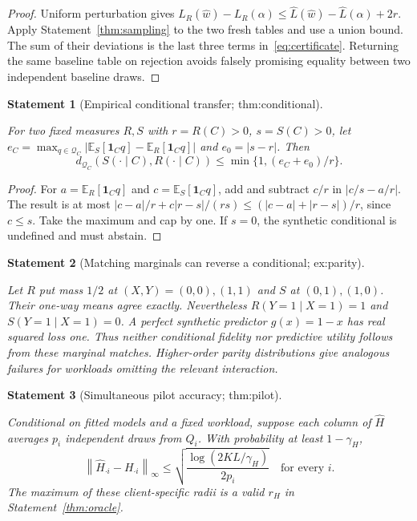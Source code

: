 \documentclass[11pt]{article}
\newtheorem{statement}{Statement}
\newcommand{\E}{\mathbb E}\newcommand{\Prb}{\mathbb P}\newcommand{\ind}{\mathbf 1}
\newcommand{\Q}{\mathcal Q}\newcommand{\Z}{\mathcal Z}\newcommand{\W}{\mathcal W}
\newcommand{\norm}[1]{\left\lVert#1\right\rVert}\newcommand{\qh}{\widehat H}
\begin{document}
\begin{proof}
Uniform perturbation gives $L_R(\widehat w)-L_R(\alpha)\le\widehat L(\widehat w)-\widehat L(\alpha)+2r$. Apply Statement~\ref{thm:sampling} to the two fresh tables and use a union bound. The sum of their deviations is the last three terms in~\eqref{eq:certificate}. Returning the same baseline table on rejection avoids falsely promising equality between two independent baseline draws.
\end{proof}

\begin{statement}[Empirical conditional transfer; thm:conditional]\label{thm:conditional}

For two fixed measures $R,S$ with $r=R(C)>0$, $s=S(C)>0$, let
$e_C=\max_{q\in\Q_C}|\E_S[\ind_Cq]-\E_R[\ind_Cq]|$ and $e_0=|s-r|$. Then
\begin{equation}\label{eq:conditional}
d_{\Q_C}(S(\cdot\mid C),R(\cdot\mid C))
\le\min\{1,(e_C+e_0)/r\}.
\end{equation}

\end{statement}

\begin{proof}
For $a=\E_R[\ind_Cq]$ and $c=\E_S[\ind_Cq]$, add and subtract $c/r$ in $|c/s-a/r|$. The result is at most $|c-a|/r+c|r-s|/(rs)\le(|c-a|+|r-s|)/r$, since $c\le s$. Take the maximum and cap by one. If $s=0$, the synthetic conditional is undefined and must abstain.
\end{proof}

\begin{statement}[Matching marginals can reverse a conditional; ex:parity]\label{ex:parity}

Let $R$ put mass $1/2$ at $(X,Y)=(0,0),(1,1)$ and $S$ at $(0,1),(1,0)$. Their one-way means agree exactly. Nevertheless $R(Y=1\mid X=1)=1$ and $S(Y=1\mid X=1)=0$. A perfect synthetic predictor $g(x)=1-x$ has real squared loss one. Thus neither conditional fidelity nor predictive utility follows from these marginal matches. Higher-order parity distributions give analogous failures for workloads omitting the relevant interaction.

\end{statement}


\begin{statement}[Simultaneous pilot accuracy; thm:pilot]\label{thm:pilot}

Conditional on fitted models and a fixed workload, suppose each column of $\qh$ averages $p_i$ independent draws from $Q_i$. With probability at least $1-\gamma_H$,
\begin{equation}
\norm{\qh_{\cdot i}-H_{\cdot i}}_\infty
\le\sqrt{\frac{\log(2KL/\gamma_H)}{2p_i}}
\quad\text{for every }i.
\end{equation}
The maximum of these client-specific radii is a valid $r_H$ in Statement~\ref{thm:oracle}.

\end{statement}
\end{document}
